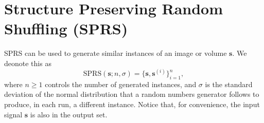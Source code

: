 \documentclass{article}
\begin{document}

\section{Structure Preserving Random Shuffling (SPRS)}
\label{sec:SPRS}

SPRS can be used to generate similar instances of an image or volume
$\mathbf{s}$. We deonote this as
\begin{equation}
  \mathrm{SPRS}(\mathbf{s}; n, \sigma) = \{\mathbf{s}, \mathbf{s}^{(i)}\}_{i=1}^n,
\end{equation}
where $n\ge 1$ controls the number of generated instances, and
$\sigma$ is the standard deviation of the normal distribution that a
random numbers generator follows to produce, in each run, a different
instance. Notice that, for convenience, the input signal $\mathbf{s}$
is also in the output set.
\end{document}
